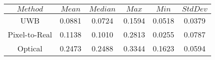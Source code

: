 \begin{table}[h]
\centering
\begin{tabular}{|c|c|c|c|c|c|}
\hline
$Method$ & $Mean$ & $Median$ & $Max$ & $Min$ & $StdDev$ \\
\hline
UWB & 0.0881 & 0.0724 & 0.1594 & 0.0518 & 0.0379 \\
\hline
Pixel-to-Real & 0.1138 & 0.1010 & 0.2813 & 0.0255 & 0.0787 \\
\hline
Optical & 0.2473 & 0.2488 & 0.3344 & 0.1623 & 0.0594 \\
\hline
\end{tabular}
\end{table}
